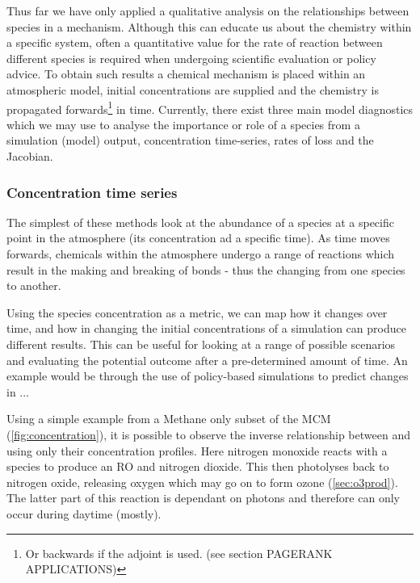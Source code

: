 Thus far we have only applied a qualitative analysis on the relationships between species in a mechanism. Although this can educate us about the chemistry within a specific system, often a quantitative value for the rate of reaction between different species is required when undergoing scientific evaluation or policy advice. To obtain such results a chemical mechanism is placed within an atmospheric model, initial concentrations are supplied and the chemistry is propagated forwards\footnote{Or backwards if the adjoint is used. (see section PAGERANK APPLICATIONS)} in time. Currently, there exist three main model diagnostics which we may use to analyse the importance or role of a species from a simulation (model) output, concentration time-series, rates of loss and the Jacobian.


\subsubsection{Concentration time series}

The simplest of these methods look at the abundance of a  species at a specific point in the atmosphere (its concentration ad a specific time). As time moves forwards, chemicals within the atmosphere undergo a range of reactions which result in the making and breaking of bonds - thus the changing from one species to another. 

Using the species concentration as a metric, we can map how it changes over time, and how in changing the initial concentrations of a simulation can produce different results. This can be useful for looking at a range of possible scenarios and evaluating the potential outcome after a pre-determined amount of time. An example would be through the use of policy-based simulations to predict changes in ...

Using a simple example from a Methane only subset of the MCM (\autoref{fig:concentration}), it is possible to observe the inverse relationship between  and  using only their concentration profiles. Here nitrogen monoxide reacts with a  species to produce an RO and nitrogen dioxide.
This then photolyses back to nitrogen oxide, releasing oxygen which may go on to form ozone (\autoref{sec:o3prod}). The latter part of this reaction is dependant on photons and therefore can only occur during daytime (mostly).
 
